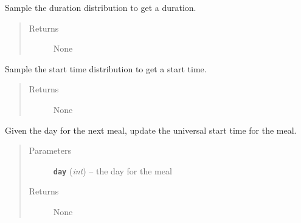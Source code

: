 \documentclass[letterpaper,10pt,english]{sphinxmanual}
\begin{document}
\begin{fulllineitems}
\begin{fulllineitems}
\begin{quote}
\begin{description}
\end{description}\end{quote}

\end{fulllineitems}


\begin{fulllineitems}
\label{meal:meal.Meal.update_dt}
Sample the duration distribution to get a duration.
\begin{quote}\begin{description}
\item[{Returns}] \leavevmode
None

\end{description}\end{quote}

\end{fulllineitems}


\begin{fulllineitems}
\label{meal:meal.Meal.update_start}
Sample the start time distribution to get a start time.
\begin{quote}\begin{description}
\item[{Returns}] \leavevmode
None

\end{description}\end{quote}

\end{fulllineitems}


\begin{fulllineitems}
\label{meal:meal.Meal.update_start_univ}
Given the day for the next meal, update the universal start time for the meal.
\begin{quote}\begin{description}
\item[{Parameters}] \leavevmode
\textbf{\texttt{day}} (\emph{int}) -- the day for the meal

\item[{Returns}] \leavevmode
None

\end{description}\end{quote}

\end{fulllineitems}


\end{fulllineitems}
\end{document}
